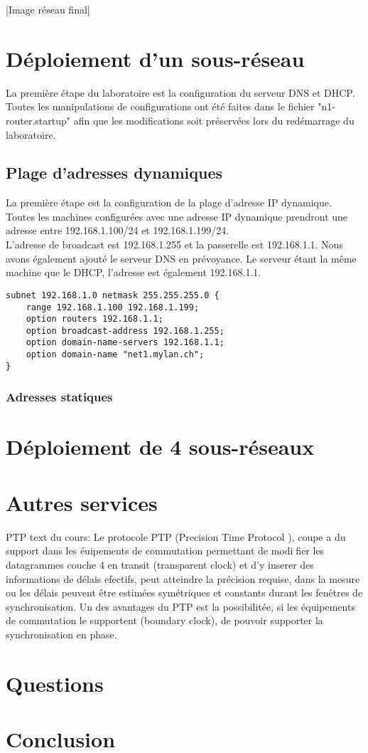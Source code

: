 \documentclass{article}
\begin{document}
[Image réseau final]


\section{Déploiement d'un sous-réseau}

La première étape du laboratoire est la configuration du serveur DNS et DHCP. Toutes les manipulations de configurations ont été faites dans le fichier "n1-router.startup" afin que les modifications soit préservées lors du redémarrage du laboratoire.


\subsection{Plage d'adresses dynamiques}

La première étape est la configuration de la plage d'adresse IP dynamique. Toutes les machines configurées avec une adresse IP dynamique prendront une adresse entre 192.168.1.100/24 et 192.168.1.199/24.\\

L'adresse de broadcast est 192.168.1.255 et la passerelle est 192.168.1.1. Nous avons également ajouté le serveur DNS en prévoyance. Le serveur étant la même machine que le DHCP, l'adresse est également 192.168.1.1.\\

\begin{lstlisting}
subnet 192.168.1.0 netmask 255.255.255.0 {
	range 192.168.1.100 192.168.1.199;
	option routers 192.168.1.1;
	option broadcast-address 192.168.1.255;
	option domain-name-servers 192.168.1.1;
	option domain-name "net1.mylan.ch";
}
\end{lstlisting}


\subsubsection{Adresses statiques}


\section{Déploiement de 4 sous-réseaux}

\section{Autres services}


PTP text du cours:
Le protocole PTP (Precision Time Protocol ), coupe a du support dans les éuipements de commutation permettant de modifier les datagrammes couche 4 en transit (transparent clock) et d'y inserer des informations de délais efectifs, peut atteindre la précision requise, dans la mesure ou les délais peuvent être estimées symétriques et constants durant les fenêtres de synchronisation. Un des avantages du
PTP est la possibilitée, si les équipements de commutation le supportent (boundary clock), de pouvoir supporter la synchronisation en phase.

\section{Questions}

\section{Conclusion}

\printbibliography
\end{document}
